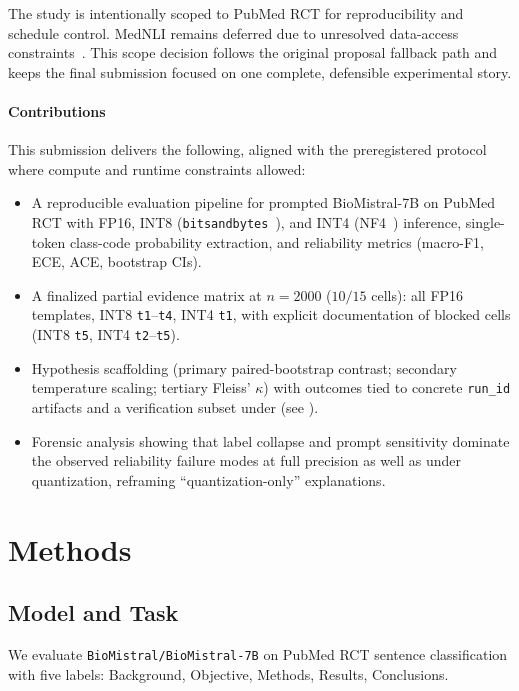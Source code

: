 \documentclass[conference]{IEEEtran}
\begin{document}
The study is intentionally scoped to PubMed RCT for reproducibility and schedule control.
MedNLI remains deferred due to unresolved data-access constraints~\cite{romanov2018}.
This scope decision follows the original proposal fallback path and keeps the final submission focused on one complete, defensible experimental story.

\paragraph{Contributions}
This submission delivers the following, aligned with the preregistered protocol where compute and runtime constraints allowed:
\begin{itemize}
  \item A reproducible evaluation pipeline for prompted BioMistral-7B on PubMed RCT with FP16, INT8 (\texttt{bitsandbytes}~\cite{dettmers2022llmint8}), and INT4 (NF4~\cite{dettmers2023qlora}) inference, single-token class-code probability extraction, and reliability metrics (macro-F1, ECE, ACE, bootstrap CIs).
  \item A finalized partial evidence matrix at $n=2000$ ($10/15$ cells): all FP16 templates, INT8 \texttt{t1}--\texttt{t4}, INT4 \texttt{t1}, with explicit documentation of blocked cells (INT8 \texttt{t5}, INT4 \texttt{t2}--\texttt{t5}).
  \item Hypothesis scaffolding (primary paired-bootstrap contrast; secondary temperature scaling; tertiary Fleiss' $\kappa$) with outcomes tied to concrete \texttt{run\_id} artifacts and a verification subset under  (see ).
  \item Forensic analysis showing that label collapse and prompt sensitivity dominate the observed reliability failure modes at full precision as well as under quantization, reframing ``quantization-only'' explanations.
\end{itemize}

\section{Methods}

\subsection{Model and Task}
We evaluate \texttt{BioMistral/BioMistral-7B} on PubMed RCT sentence classification with five labels: Background, Objective, Methods, Results, Conclusions.
\end{document}

